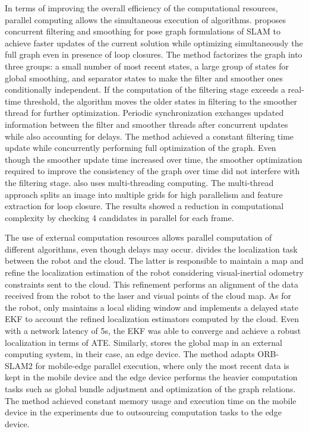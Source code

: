 In terms of improving the overall efficiency of the computational resources, parallel computing allows the simultaneous execution of algorithms.
\cite{williams-et-al:2014:0278364914531056} proposes concurrent filtering and smoothing for pose graph formulations of SLAM to achieve faster updates of the current solution while optimizing simultaneously the full graph even in presence of loop closures. The method factorizes the graph into three groups: a small number of most recent states, a large group of states for global smoothing, and separator states to make the filter and smoother ones conditionally independent. If the computation of the filtering stage exceeds a real-time threshold, the algorithm moves the older states in filtering to the smoother thread for further optimization. Periodic synchronization exchanges updated information between the filter and smoother threads after concurrent updates while also accounting for delays. The method achieved a constant filtering time update while concurrently performing full optimization of the graph. Even though the smoother update time increased over time, the smoother optimization required to improve the consistency of the graph over time did not interfere with the filtering stage.
\cite{yang-et-al:2021:12054} also uses multi-threading computing. The multi-thread approach splits an image into multiple grids for high parallelism and feature extraction for loop closure. The results showed a reduction in computational complexity by checking 4 candidates in parallel for each frame.

The use of external computation resources allows parallel computation of different algorithms, even though delays may occur.
\cite{ding-et-al:2019:8968550} divides the localization task between the robot and the cloud. The latter is responsible to maintain a map and refine the localization estimation of the robot considering visual-inertial odometry constraints sent to the cloud. This refinement performs an alignment of the data received from the robot to the laser and visual points of the cloud map. As for the robot, only maintains a local sliding window and implements a delayed state EKF to account the refined localization estimators computed by the cloud. Even with a network latency of 5s, the EKF was able to converge and achieve a robust localization in terms of ATE.
Similarly, \cite{ding-et-al:2019:8968550} stores the global map in an external computing system, in their case, an edge device. The method adapts ORB-SLAM2 for mobile-edge parallel execution, where only the most recent data is kept in the mobile device and the edge device performs the heavier computation tasks such as global bundle adjustment and optimization of the graph relations. The method achieved constant memory usage and execution time on the mobile device in the experiments due to outsourcing computation tasks to the edge device.



